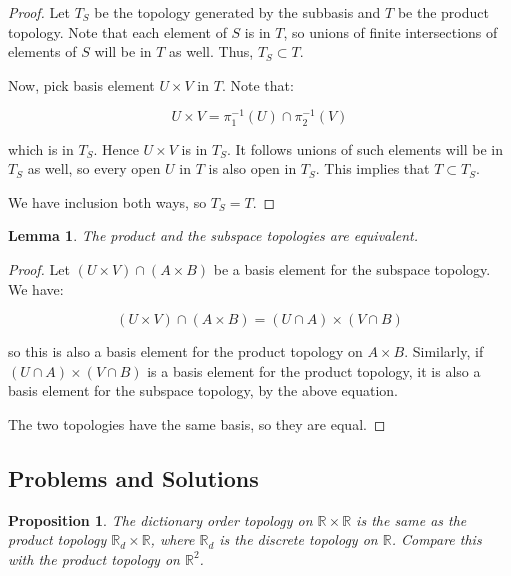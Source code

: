 \documentclass[10pt, oneside]{amsart}
\newtheorem{lem}{Lemma}
\newtheorem{prop}{Proposition}
\begin{document}
    \begin{proof}
      Let $T_S$ be the topology generated by the subbasis and $T$ be the product topology. Note that each element of $S$ is in $T$, so unions of
      finite intersections of elements of $S$ will be in $T$ as well. Thus, $T_S \subset T$.
      \newline

      Now, pick basis element $U \times V$ in $T$. Note that:

      $$U \times V = \pi_1^{-1}(U) \cap \pi_2^{-1}(V)$$

      which is in $T_S$. Hence $U \times V$ is in $T_S$. It follows unions of such elements will be in $T_S$ as well, so
      every open $U$ in $T$ is also open in $T_S$. This implies that $T \subset T_S$.
      \newline

      We have inclusion both ways, so $T_S = T$.
    \end{proof}

    \begin{lem}
      The product and the subspace topologies are equivalent.
    \end{lem}

    \begin{proof}
      Let $(U \times V) \cap (A \times B)$ be a basis element for the subspace topology. We have:

      $$(U \times V) \cap (A \times B) = (U \cap A) \times (V \cap B)$$

      so this is also a basis element for the product topology on $A \times B$. Similarly, if $(U \cap A) \times (V \cap B)$
      is a basis element for the product topology, it is also a basis element for the subspace topology, by the above equation.
      \newline

      The two topologies have the same basis, so they are equal.
    \end{proof}

    \subsection{Problems and Solutions}

    \begin{prop}
      The dictionary order topology on $\mathbb{R} \times \mathbb{R}$ is the same as the product topology $\mathbb{R}_d \times \mathbb{R}$, where $\mathbb{R}_d$ is the discrete topology on
      $\mathbb{R}$. Compare this with the product topology on $\mathbb{R}^2$.
    \end{prop}
\end{document}

